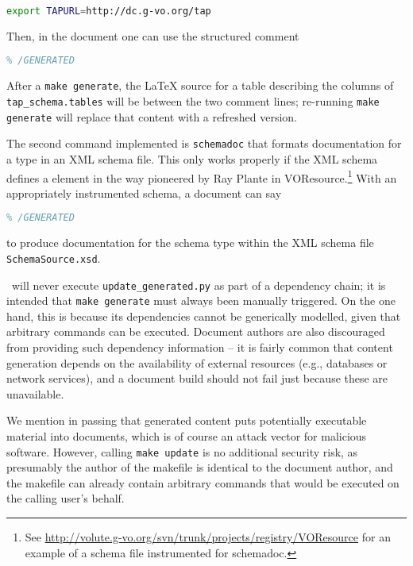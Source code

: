 \documentclass[11pt,a4paper]{ivoa}
\begin{document}
\begin{lstlisting}[language=sh]
export TAPURL=http://dc.g-vo.org/tap
\end{lstlisting}

Then, in the document one can use the structured comment

\begin{lstlisting}[language=TeX]
% GENERATED: !taptable tap_schema.tables
% /GENERATED
\end{lstlisting}

After a \texttt{make generate}, the LaTeX source for a table describing
the columns of \texttt{tap\_schema.tables} will be between the two
comment lines; re-running \texttt{make generate} will replace that
content with a refreshed version.

The second command implemented is \texttt{schemadoc} that formats
documentation for a type in an XML schema file.  This only works
properly if the XML schema defines a  element in
the way pioneered by Ray Plante in
VOResource.\footnote{See
\url{http://volute.g-vo.org/svn/trunk/projects/registry/VOResource} for
an example of a schema file instrumented for schemadoc.}
With an appropriately instrumented schema, a document can say

\begin{lstlisting}[language=TeX]
% GENERATED: !schemadoc SchemaSource.xsd MyType
% /GENERATED
\end{lstlisting}

to produce documentation for the schema type  within
the XML schema file \texttt{SchemaSource.xsd}.

\ivoatex~will never execute \texttt{update\_generated.py} as part of a
dependency chain; it is intended that \texttt{make generate} must always
been manually triggered.  On the one hand, this is because its
dependencies cannot be generically modelled, given that arbitrary
commands can be executed.  Document authors are also discouraged from
providing such dependency information -- it is fairly common that
content generation depends on the availability of external resources
(e.g., databases or network services), and a document build should not
fail just because these are unavailable.

We mention in passing that generated content puts potentially executable
material into documents, which is of course an attack vector for
malicious software.  However, calling \texttt{make update} is no
additional security risk, as presumably the author of the makefile is
identical to the document author, and the makefile can already contain
arbitrary commands that would be executed on the calling user's behalf.
\end{document}
